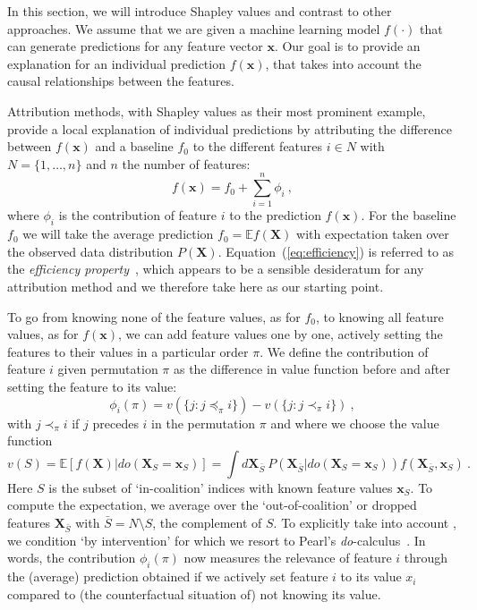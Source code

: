 \documentclass{article}
\newcommand{\vX}{\mathbf{X}}
\newcommand{\vx}{\mathbf{x}}
\newcommand{\expectation}{\mathbb{E}}
\newcommand{\contribution}{{\phi}}
\newcommand{\val}{{v}}
\newcommand{\dodo}{\mathit{do}}
\newcommand{\lvdo}[1]{\dodo(\vX_{#1} = \vx_{#1})}
\newcommand{\perm}{\pi}
\newcommand{\allfeatures}{{N}}
\begin{document}
In this section, we will introduce  Shapley values and contrast  to other approaches. We assume that we are given a machine learning model $f(\cdot)$ that can generate predictions for any feature vector $\vx$. Our goal is to provide an explanation for an individual prediction $f(\vx)$, that takes into account the causal relationships between the features.

Attribution methods, with Shapley values as their most prominent example, provide a local explanation of individual predictions by attributing the difference between $f(\vx)$ and a baseline $f_0$ to the different features $i \in \allfeatures$ with $\allfeatures = \{1,\ldots,n\}$ and $n$ the number of features:
\begin{equation}
f(\vx) = f_0 + \sum_{i=1}^n \contribution_i \: ,
\label{eq:efficiency}
\end{equation}
where $\contribution_i$ is the contribution of feature $i$ to the prediction $f(\vx)$. For the baseline $f_0$ we will take the average prediction $f_0 = \expectation f(\vX)$ with expectation taken over the observed data distribution $P(\vX)$. Equation~(\ref{eq:efficiency}) is referred to as the {\em efficiency property}~\cite{shapley1953value}, which appears to be a sensible desideratum for any attribution method and we therefore take here as our starting point.

To go from knowing none of the feature values, as for $f_0$, to knowing all feature values, as for $f(\vx)$, we can add feature values one by one, actively setting the features to their values in a particular order $\perm$. We define the contribution of feature $i$ given permutation $\perm$ as the difference in value function before and after setting the feature to its value:
\begin{equation}
\contribution_i(\perm) = \val(\{j: j \preceq_\perm i\}) - \val(\{j: j \prec_\perm i\}) \: ,
\label{eq:contperm}
\end{equation}
with $j \prec_\perm i$ if $j$ precedes $i$ in the permutation $\perm$
and where we choose the value function
\begin{equation}
\val(S) = \expectation \left[f(\vX) | \lvdo{S} \right] = \int d\vX_{\bar{S}} \: P(\vX_{\bar{S}}|\lvdo{S}) f(\vX_{\bar{S}},\vx_S) \: .
\label{eq:valuedef}
\end{equation}
Here $S$ is the subset of `in-coalition' indices with known feature values $\vx_S$. To compute the expectation, we average over the `out-of-coalition' or dropped features $\vX_{\bar{S}}$ with $\bar{S} = \allfeatures \setminus S$, the complement of $S$. To explicitly take into account , we  condition `by intervention' for which we resort to Pearl's \textit{do}-calculus~\cite{pearl1995causal}. In words, the contribution $\contribution_i(\perm)$ now measures the relevance of feature $i$ through the (average) prediction obtained if we actively set feature $i$ to its value $x_i$ compared to (the counterfactual situation of) not knowing its value.
\end{document}
